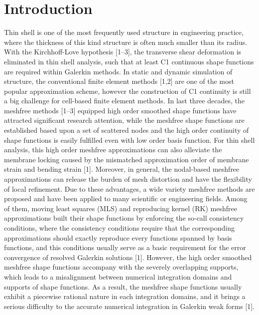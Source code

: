 \section{Introduction}
Thin shell is one of the most frequently used structure in engineering practice, where the thickness of this kind structure is often much smaller than its radius. With the Kirchhoff-Love hypothesis [1–3], the transverse shear deformation is eliminated in thin shell analysis, such that at least C1 continuous shape functions are required within Galerkin methods. In static and dynamic simulation of structure, the conventional finite element methods [1,2] are one of the most popular approximation scheme, however the construction of C1 continuity is still a big challenge for cell-based finite element methods. In last three decades, the meshfree methods [1–3] equipped high order smoothed shape functions have attracted significant research attention, while the meshfree shape functions are established based upon a set of scattered nodes and the high order continuity of shape functions is easily fulfilled even with low order basis function. For thin shell analysis, this high order meshfree approximations can also alleviate the membrane locking caused by the mismatched approximation order of membrane strain and bending strain [1]. Moreover, in general, the nodal-based meshfree approximations can release the burden of mesh distortion and have the flexibility of local refinement. Due to these advantages, a wide variety meshfree methods are proposed and have been applied to many scientific or engineering fields. Among of them, moving least squares (MLS) and reproducing kernel (RK) meshfree approximations built their shape functions by enforcing the so-call consistency conditions, where the consistency conditions require that the corresponding approximations should exactly reproduce every functions spanned by basis functions, and this conditions usually serve as a basic requirement for the error convergence of resolved Galerkin solutions [1]. However, the high order smoothed meshfree shape functions accompany with the severely overlapping supports, which leads to a misalignment between numerical integration domains and supports of shape functions. As a result, the meshfree shape functions usually exhibit a piecewise rational nature in each integration domains, and it brings a serious difficulty to the accurate numerical integration in Galerkin weak forms [1].

